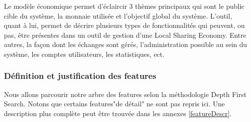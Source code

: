 Le modèle économique permet d'éclaircir 3 thèmes principaux qui sont le public cible du système,  la monnaie utilisée et l'objectif global du système.  L'outil,  quant à lui,  permet de décrire plusieurs types de fonctionnalités qui peuvent,  ou pas,  être présentes dans un outil de gestion d'une Local Sharing Economy.  Entre autres,  la façon dont les échanges sont gérés,  l'administration possible au sein du système,  les comptes utilisateurs,  les statistiques,  ect.  

\subsubsection{Définition et justification des features}

Nous allons parcourir notre arbre des features selon la méthodologie Depth First Search.  Notons que certains features"de détail"  ne sont pas repris ici.  Une description plus complète peut être trouvée dans les annexes \ref{featureDescr}.

